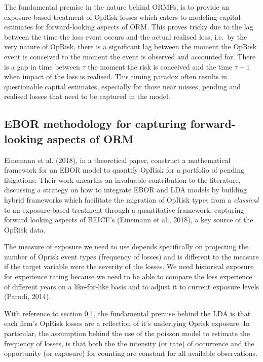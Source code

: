 \documentclass[]{DissertateUSU}
\begin{document}
The fundamental premise in the nature behind ORMFs, is to provide an
exposure-based treatment of OpRisk losses which caters to modeling
capital estimates for forward-looking aspects of ORM. This proves tricky
due to the lag between the time the loss event occurs and the actual
realised loss, i.e.~by the very nature of OpRisk, there is a significant
lag between the moment the OpRisk event is conceived to the moment the
event is observed and accounted for. There is a gap in time between
\(\tau\) the moment the risk is conceived and the time \(\tau+1\) when
impact of the loss is realised. This timing paradox often results in
questionable capital estimates, especially for those near misses,
pending and realised losses that need to be captured in the
model.\medskip

\subsection{EBOR methodology for capturing forward-looking aspects of ORM}
\label{ssec:Applicability of EBOR methodology for capturing forward-looking aspects of ORM}

Einemann et al. (2018), in a theoretical paper, construct a mathematical
framework for an EBOR model to quantify OpRisk for a portfolio of
pending litigations. Their work unearths an invaluable contribution to
the literature, discussing a strategy on how to integrate EBOR and LDA
models by building hybrid frameworks which facilitate the migration of
OpRisk types from a \emph{classical} to an exposure-based treatment
through a quantitative framework, capturing forward looking aspects of
BEICF's (Einemann et al., 2018), a key source of the OpRisk data.

The measure of exposure we need to use depends specifically on
projecting the number of Oprisk event types (frequency of losses) and is
different to the measure if the target variable were the severity of the
losses. We need historical exposure for experience rating because we
need to be able to compare the loss experience of different years on a
like-for-like basis and to adjust it to current exposure levels (Parodi,
2014).\medskip 

With reference to section
\ref{ssec:Applicability of EBOR methodology for capturing forward-looking aspects of ORM},
the fundamental premise behind the LDA is that each firm's OpRisk losses
are a reflection of it's underlying Oprisk exposure. In particular, the
assumption behind the use of the poisson model to estimate the frequency
of losses, is that both the the intensity (or rate) of occurrence and
the opportunity (or exposure) for counting are constant for all
available observations.\medskip
\end{document}
